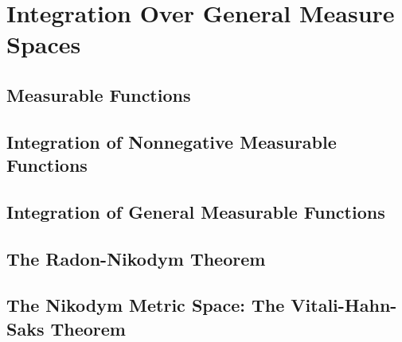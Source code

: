 \chapter{Integration Over General Measure Spaces}

\section{Measurable Functions}
\section{Integration of Nonnegative Measurable Functions}
\section{Integration of General Measurable Functions}
\section{The Radon-Nikodym Theorem}
\section{The Nikodym Metric Space: The Vitali-Hahn-Saks Theorem}
